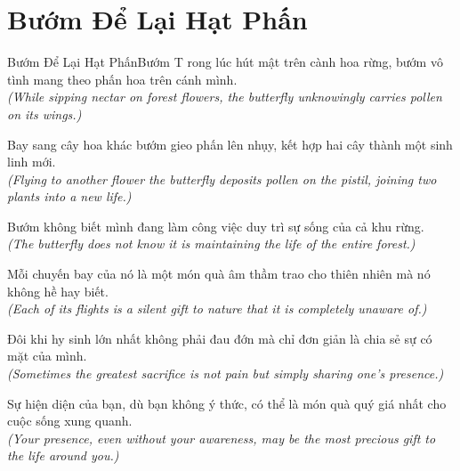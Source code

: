\section{Bướm Để Lại Hạt Phấn}
\begin{truyen}{Bướm Để Lại Hạt Phấn}{Bướm}
T rong lúc hút mật trên cành hoa rừng, bướm vô tình mang theo phấn hoa trên cánh mình.\\
\textit{(While sipping nectar on forest flowers, the butterfly unknowingly carries pollen on its wings.)}

Bay sang cây hoa khác bướm gieo phấn lên nhụy, kết hợp hai cây thành một sinh linh mới.\\
\textit{(Flying to another flower the butterfly deposits pollen on the pistil, joining two plants into a new life.)}

Bướm không biết mình đang làm công việc duy trì sự sống của cả khu rừng.\\
\textit{(The butterfly does not know it is maintaining the life of the entire forest.)}

Mỗi chuyến bay của nó là một món quà âm thầm trao cho thiên nhiên mà nó không hề hay biết.\\
\textit{(Each of its flights is a silent gift to nature that it is completely unaware of.)}

Đôi khi hy sinh lớn nhất không phải đau đớn mà chỉ đơn giản là chia sẻ sự có mặt của mình.\\
\textit{(Sometimes the greatest sacrifice is not pain but simply sharing one's presence.)}

\end{truyen}
\begin{baihoc}
  Sự hiện diện của bạn, dù bạn không ý thức, có thể là món quà quý giá nhất cho cuộc sống xung quanh.\\
  \textit{(Your presence, even without your awareness, may be the most precious gift to the life around you.)}
\end{baihoc}

